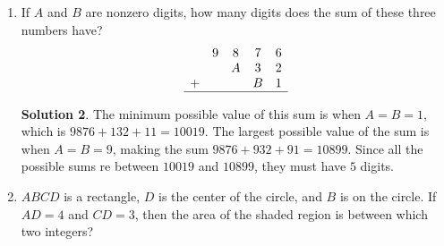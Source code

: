 \documentclass{article}
\theoremstyle{definition}
\newtheorem*{solution}{Solution}
\begin{document}
\begin{multicols*}{2}
\begin{enumerate}
\begin{center}
            \end{center}
            \begin{solution}
                Fold the four squares into four sides of a cube.
                Then, there are six unconnected edges.
                For each open edge, we can add a square/side, so the answer is $6$.
            \end{solution}
        \item If $A$ and $B$ are nonzero digits, how many digits does the sum of these three numbers have?
			\[
				\begin{array}{ccccc}
					  & 9 & 8 & 7 & 6 \\
					  &   & A & 3 & 2 \\
					+ &   &   & B & 1 \\
					\hline
				\end{array}
			\]
            \begin{solution}
                The minimum possible value of this sum is when $A = B = 1$, which is $9876 + 132 + 11 = 10019$.
                The largest possible value of the sum is when $A = B = 9$, making the sum $9876 + 932 + 91 = 10899$.
                Since all the possible sums re between $10019$ and $10899$, they must have $5$ digits.
            \end{solution}
        \item $ABCD$ is a rectangle, $D$ is the center of the circle, and $B$ is on the circle.
            If $AD = 4$ and $CD = 3$, then the area of the shaded region is between which two integers?
            \begin{center}
\end{center}
\end{enumerate}
\end{multicols*}
\end{document}
